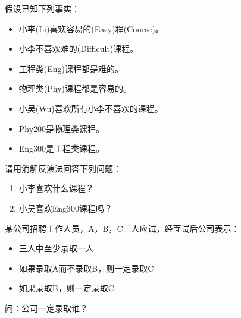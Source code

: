 \begin{question}
	假设已知下列事实：
	
	\begin{itemize}
		\item 小李(Li)喜欢容易的(Easy)程(Course)。
		\item 小李不喜欢难的(Difficult)课程。
		\item 工程类(Eng)课程都是难的。
		\item 物理类(Phy)课程都是容易的。
		\item 小吴(Wu)喜欢所有小李不喜欢的课程。
		\item Phy200是物理类课程。
		\item Eng300是工程类课程。
	\end{itemize}
	请用消解反演法回答下列问题：
	\begin{enumerate}
		\item 小李喜欢什么课程？
		\item 小吴喜欢Eng300课程吗？
	\end{enumerate}
\end{question}

\begin{question}
	某公司招聘工作人员，A，B，C三人应试，经面试后公司表示：
	\begin{itemize}
		\item 三人中至少录取一人
		\item 如果录取A而不录取B，则一定录取C
		\item 如果录取B，则一定录取C
	\end{itemize}
	问：公司一定录取谁？
\end{question}
